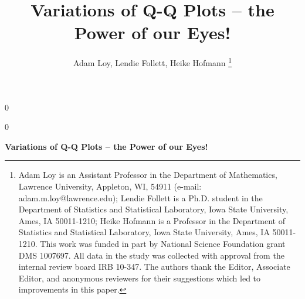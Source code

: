 \documentclass[12pt]{article}\usepackage[]{graphicx}\usepackage[]{color}
\newcommand{\blind}{0}
\begin{document}
\def\spacingset#1{\renewcommand{\baselinestretch}%
{#1}\small\normalsize} \spacingset{1}


\blind
{
  \title{\bf Variations of Q-Q Plots -- the Power of our Eyes!}
\author{Adam Loy, Lendie Follett, Heike Hofmann
\thanks{Adam Loy is an Assistant Professor in the Department of Mathematics, Lawrence University, Appleton, WI, 54911 (e-mail: adam.m.loy@lawrence.edu);  Lendie Follett is a Ph.D. student in the Department of Statistics and Statistical Laboratory, Iowa State University, Ames, IA 50011-1210; Heike Hofmann is a Professor in the Department of Statistics and Statistical Laboratory, Iowa State University, Ames, IA 50011-1210. This work was funded in part by National Science Foundation grant DMS 1007697. All data  in the study was collected  with approval from the internal review board IRB 10-347. The authors thank the Editor, Associate Editor, and anonymous reviewers for their suggestions which led to improvements in this paper.}}
  \maketitle
} \fi

\blind
{
  \bigskip
  \bigskip
  \bigskip
  \begin{center}
    {\LARGE\bf Variations of Q-Q Plots -- the Power of our Eyes!}
\end{center}
  \medskip
} \fi


\bigskip
\end{document}
